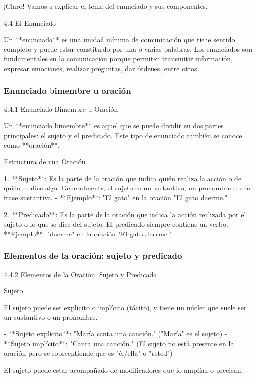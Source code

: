 ¡Claro! Vamos a explicar el tema del enunciado y sus componentes.

 4.4 El Enunciado

Un **enunciado** es una unidad mínima de comunicación que tiene sentido completo y puede estar constituido por una o varias palabras. Los enunciados son fundamentales en la comunicación porque permiten transmitir información, expresar emociones, realizar preguntas, dar órdenes, entre otros.


\subsubsection{Enunciado bimembre u oración}

 4.4.1 Enunciado Bimembre u Oración

Un **enunciado bimembre** es aquel que se puede dividir en dos partes principales: el sujeto y el predicado. Este tipo de enunciado también se conoce como **oración**.



 Estructura de una Oración

1. **Sujeto**: Es la parte de la oración que indica quién realiza la acción o de quién se dice algo. Generalmente, el sujeto es un sustantivo, un pronombre o una frase sustantiva.
   - **Ejemplo**: "El gato" en la oración "El gato duerme."

2. **Predicado**: Es la parte de la oración que indica la acción realizada por el sujeto o lo que se dice del sujeto. El predicado siempre contiene un verbo.
   - **Ejemplo**: "duerme" en la oración "El gato duerme."


\subsubsection{Elementos de la oración: sujeto y predicado}

 4.4.2 Elementos de la Oración: Sujeto y Predicado

 Sujeto

El sujeto puede ser explícito o implícito (tácito), y tiene un núcleo que suele ser un sustantivo o un pronombre.

- **Sujeto explícito**: "María canta una canción." ("María" es el sujeto)
- **Sujeto implícito**: "Canta una canción." (El sujeto no está presente en la oración pero se sobreentiende que es "él/ella" o "usted")

El sujeto puede estar acompañado de modificadores que lo amplían o precisan:

